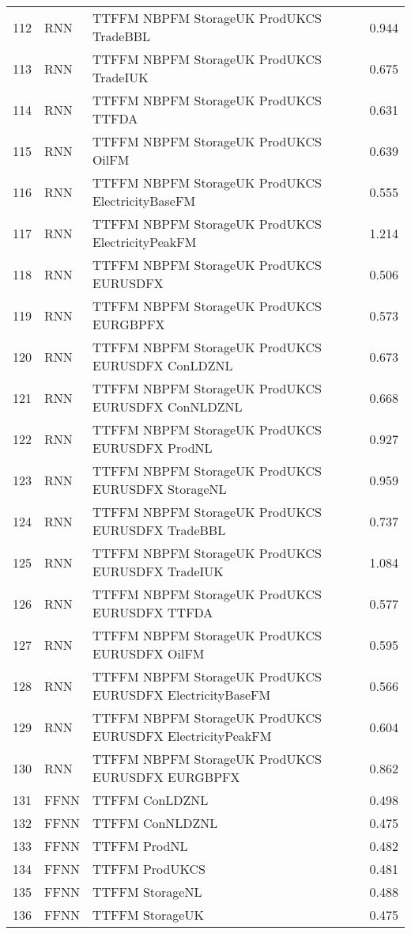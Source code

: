 \begin{table}[ht]
\begin{tabular}{rllr}
  112 & RNN & TTFFM NBPFM StorageUK ProdUKCS TradeBBL & 0.944 \\ 
  113 & RNN & TTFFM NBPFM StorageUK ProdUKCS TradeIUK & 0.675 \\ 
  114 & RNN & TTFFM NBPFM StorageUK ProdUKCS TTFDA & 0.631 \\ 
  115 & RNN & TTFFM NBPFM StorageUK ProdUKCS OilFM & 0.639 \\ 
  116 & RNN & TTFFM NBPFM StorageUK ProdUKCS ElectricityBaseFM & 0.555 \\ 
  117 & RNN & TTFFM NBPFM StorageUK ProdUKCS ElectricityPeakFM & 1.214 \\ 
  118 & RNN & TTFFM NBPFM StorageUK ProdUKCS EURUSDFX & 0.506 \\ 
  119 & RNN & TTFFM NBPFM StorageUK ProdUKCS EURGBPFX & 0.573 \\ 
  120 & RNN & TTFFM NBPFM StorageUK ProdUKCS EURUSDFX ConLDZNL & 0.673 \\ 
  121 & RNN & TTFFM NBPFM StorageUK ProdUKCS EURUSDFX ConNLDZNL & 0.668 \\ 
  122 & RNN & TTFFM NBPFM StorageUK ProdUKCS EURUSDFX ProdNL & 0.927 \\ 
  123 & RNN & TTFFM NBPFM StorageUK ProdUKCS EURUSDFX StorageNL & 0.959 \\ 
  124 & RNN & TTFFM NBPFM StorageUK ProdUKCS EURUSDFX TradeBBL & 0.737 \\ 
  125 & RNN & TTFFM NBPFM StorageUK ProdUKCS EURUSDFX TradeIUK & 1.084 \\ 
  126 & RNN & TTFFM NBPFM StorageUK ProdUKCS EURUSDFX TTFDA & 0.577 \\ 
  127 & RNN & TTFFM NBPFM StorageUK ProdUKCS EURUSDFX OilFM & 0.595 \\ 
  128 & RNN & TTFFM NBPFM StorageUK ProdUKCS EURUSDFX ElectricityBaseFM & 0.566 \\ 
  129 & RNN & TTFFM NBPFM StorageUK ProdUKCS EURUSDFX ElectricityPeakFM & 0.604 \\ 
  130 & RNN & TTFFM NBPFM StorageUK ProdUKCS EURUSDFX EURGBPFX & 0.862 \\ 
  131 & FFNN & TTFFM ConLDZNL & 0.498 \\ 
  132 & FFNN & TTFFM ConNLDZNL & 0.475 \\ 
  133 & FFNN & TTFFM ProdNL & 0.482 \\ 
  134 & FFNN & TTFFM ProdUKCS & 0.481 \\ 
  135 & FFNN & TTFFM StorageNL & 0.488 \\ 
  136 & FFNN & TTFFM StorageUK & 0.475 \\ 

\end{tabular}
\end{table}
